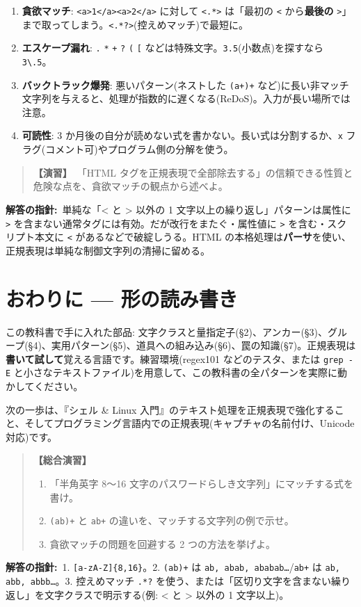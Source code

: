 \documentclass{article}
\begin{document}
\begin{enumerate}
\item \textbf{貪欲マッチ}: \texttt{<a>1</a><a>2</a>} に対して \texttt{<.*>} は「最初の \texttt{<} から\textbf{最後の} \texttt{>}」まで取ってしまう。\texttt{<.*?>}(控えめマッチ)で最短に。
\item \textbf{エスケープ漏れ}: \texttt{.} \texttt{*} \texttt{+} \texttt{?} \texttt{(} \texttt{[} などは特殊文字。\texttt{3.5}(小数点)を探すなら \texttt{3\textbackslash .5}。
\item \textbf{バックトラック爆発}: 悪いパターン(ネストした \texttt{(a+)+} など)に長い非マッチ文字列を与えると、処理が指数的に遅くなる(ReDoS)。入力が長い場所では注意。
\item \textbf{可読性}: 3 か月後の自分が読めない式を書かない。長い式は分割するか、\texttt{x} フラグ(コメント可)やプログラム側の分解を使う。
\end{enumerate}

\begin{quote}
\textbf{【演習】}\ 「HTML タグを正規表現で全部除去する」の信頼できる性質と危険な点を、貪欲マッチの観点から述べよ。
\end{quote}

\textbf{解答の指針:}\ 単純な「< と > 以外の 1 文字以上の繰り返し」パターンは属性に \texttt{>} を含まない通常タグには有効。だが改行をまたぐ・属性値に \texttt{>} を含む・スクリプト本文に \texttt{<} があるなどで破綻しうる。HTML の本格処理は\textbf{パーサ}を使い、正規表現は単純な制御文字列の清掃に留める。

\section{おわりに — 形の読み書き}

この教科書で手に入れた部品: 文字クラスと量指定子(§2)、アンカー(§3)、グループ(§4)、実用パターン(§5)、道具への組み込み(§6)、罠の知識(§7)。正規表現は\textbf{書いて試して}覚える言語です。練習環境(regex101 などのテスタ、または \texttt{grep -E} と小さなテキストファイル)を用意して、この教科書の全パターンを実際に動かしてください。

次の一歩は、『シェル \& Linux 入門』のテキスト処理を正規表現で強化すること、そしてプログラミング言語内での正規表現(キャプチャの名前付け、Unicode 対応)です。

\begin{quote}
\textbf{【総合演習】}
\begin{enumerate}
\item 「半角英字 8〜16 文字のパスワードらしき文字列」にマッチする式を書け。
\item \texttt{(ab)+} と \texttt{ab+} の違いを、マッチする文字列の例で示せ。
\item 貪欲マッチの問題を回避する 2 つの方法を挙げよ。
\end{enumerate}
\end{quote}

\textbf{解答の指針:}\ 1. \texttt{[a-zA-Z]\{8,16\}}。2. \texttt{(ab)+} は \texttt{ab, abab, ababab…}/\texttt{ab+} は \texttt{ab, abb, abbb…}。3. 控えめマッチ \texttt{.*?} を使う、または「区切り文字を含まない繰り返し」を文字クラスで明示する(例: < と > 以外の 1 文字以上)。
\end{document}
